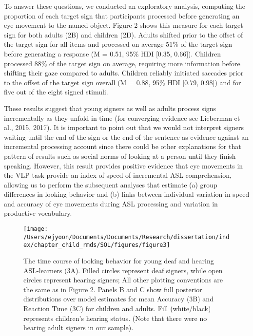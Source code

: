 \documentclass[oneside]{report}
\begin{document}
To answer these questions, we conducted an exploratory analysis,
computing the proportion of each target sign that participants processed
before generating an eye movement to the named object. Figure 2 shows
this measure for each target sign for both adults (2B) and children
(2D). Adults shifted prior to the offset of the target sign for all
items and processed on average 51\% of the target sign before generating
a response (M = 0.51, 95\% HDI {[}0.35, 0.66{]}). Children processed
88\% of the target sign on average, requiring more information before
shifting their gaze compared to adults. Children reliably initiated
saccades prior to the offset of the target sign overall (M = 0.88, 95\%
HDI {[}0.79, 0.98{]}) and for five out of the eight signed stimuli.

These results suggest that young signers as well as adults process signs
incrementally as they unfold in time (for converging evidence see
Lieberman et al., 2015, 2017). It is important to point out that we
would not interpret signers waiting until the end of the sign or the end
of the sentence as evidence against an incremental processing account
since there could be other explanations for that pattern of results such
as social norms of looking at a person until they finish speaking.
However, this result provides positive evidence that eye movements in
the VLP task provide an index of speed of incremental ASL comprehension,
allowing us to perform the subsequent analyses that estimate (a) group
differences in looking behavior and (b) links between individual
variation in speed and accuracy of eye movements during ASL processing
and variation in productive vocabulary.
\begin{figure}[!t]

{\centering \texttt{[image: /Users/ejyoon/Documents/Documents/Research/dissertation/index/chapter\_child\_rmds/SOL/figures/figure3]} 

}

\caption[The time course of looking behavior for young deaf and hearing ASL-learners]{The time course of looking behavior for young deaf and hearing ASL-learners (3A). Filled circles represent deaf signers, while open circles represent hearing signers; All other plotting conventions are the same as in Figure 2. Panels B and C show full posterior distributions over model estimates for mean Accuracy (3B) and Reaction Time (3C) for children and adults. Fill (white/black) represents children's hearing status. (Note that there were no hearing adult signers in our sample).}\label{fig:sol-tc-coda-figure}
\end{figure}
\end{document}
